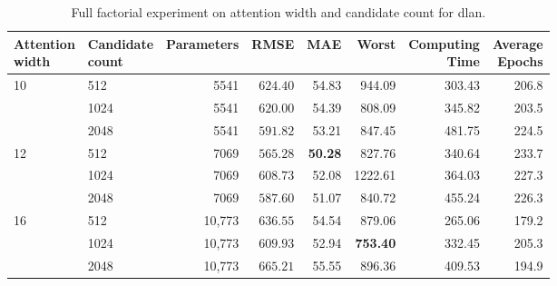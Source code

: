\documentclass[]{interact}
\newcommand{\DLAN}{\gls{dlan}\xspace}
\begin{document}
\begin{table}[tb]\centering
  \caption{Full factorial experiment on attention width and candidate count for \DLAN.}\label{tab:sensitivity}
  \small\setlength{\tabcolsep}{4pt}
  \begin{tabular}{llrrrrrr}\toprule
    \makecell{Attention\\width} & \makecell{Candidate\\count} & Parameters & RMSE                       & MAE            & Worst           & \makecell{Computing\\Time} & \makecell{Average\\Epochs} \\\midrule
    \multirow{3}{*}{10}         & 512                         & 5541      & $624.40$          & 54.83          & 944.09          & 303.43                     & 206.8 \\
                                & 1024                        & 5541      & $620.00$          & 54.39          & 808.09          & 345.82                     & 203.5 \\
                                & 2048                        & 5541      & $591.82$          & 53.21          & 847.45          & 481.75                     & 224.5 \\
    \multirow{3}{*}{12}         & 512                         & 7069      & $\mathbf{565.28}$ & \textbf{50.28} & 827.76          & 340.64                     & 233.7 \\
                                & 1024                        & 7069      & $608.73$          & 52.08          & 1222.61        & 364.03                     & 227.3 \\
                                & 2048                        & 7069      & $587.60$          & 51.07          & 840.72          & 455.24                     & 226.3 \\
    \multirow{3}{*}{16}         & 512                         & 10,773     & $636.55$          & 54.54          & 879.06          & 265.06                     & 179.2 \\
                                & 1024                        & 10,773     & $609.93$          & 52.94          & \textbf{753.40} & 332.45                     & 205.3 \\
                                & 2048                        & 10,773     & $665.21$          & 55.55          & 896.36          & 409.53                     & 194.9 \\
    \bottomrule
  \end{tabular}
\end{table}
\end{document}
